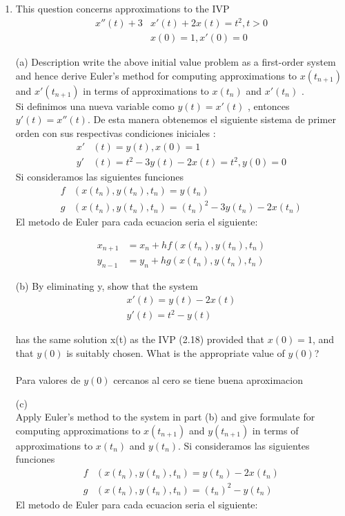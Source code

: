 \begin{enumerate}
 	\item
 	This question concerns approximations to the IVP
 	  \begin{align*}
 	     x''(t) + 3&x'(t) + 2x(t) = t^{2} , t > 0 \\
 	     &x(0) = 1, x'(0) = 0
 	  \end{align*}
 	\item[(a)]
 	Description write the above initial value problem as a first-order system
 	and hence derive Euler’s method for computing approximations to $x(t_{n+1})$ 
 	and $x'(t_{n+1})$ in terms of approximations to $x(t_n)$ and $x'(t_n)$ .\\
 	Si definimos una nueva variable como $y(t) = x'(t)$ , entonces $y'(t) = x''(t)$.
 	De esta manera obtenemos el siguiente sistema de primer orden con sus respectivas condiciones
 	iniciales :
 	 \begin{align*}
 	 x'&(t) = y(t),   x(0) = 1 \\
 	 y'&(t) = t^2 - 3y(t) - 2x(t) = t^{2} , y(0) = 0 
 	 \end{align*}
 	 	Si consideramos las siguientes funciones\\
 	 	\begin{align*}
 	 	f&(x(t_n), y(t_n), t_n) = y(t_n) \\
 	 	g&(x(t_n), y(t_n), t_n) = (t_n)^2 - 3y(t_n) - 2x(t_n)
 	 	\end{align*}
 	 	El metodo de Euler para cada ecuacion seria el siguiente:
 	 	
 	 	\begin{align*}
 	 	x_{n+1} &= x_n + hf(x(t_n), y(t_n), t_n) \\
 	 	y_{n-1} &= y_n + hg(x(t_n), y(t_n), t_n)   
 	 	\end{align*}	
 	 	
 	
 	\item[(b)]
 	By eliminating y, show that the system
 	  \begin{align*}
 		x'(t) = y(t) - 2x(t) \\
 		y'(t) = t^2 - y(t) 
 	  \end{align*}
 	  
 	has the same solution x(t) as the IVP (2.18) provided that
 	$x(0) = 1$, and that $y(0)$ is suitably chosen. What is the appropriate value of $y(0)$?\\
 	\\
 	Para valores de $y(0)$ cercanos al cero se tiene buena aproximacion
 	\item[(c)]
 	\\
 	Apply Euler’s method to the system in part (b) and give formulate for computing 
 	approximations to $x(t_{n+1})$ and $y(t_{n+1})$ in terms of approximations to $x(t_n)$ and $y(t_n)$.
 		 	Si consideramos las siguientes funciones\\
 		 	\begin{align*}
 		 	f&(x(t_n), y(t_n), t_n) = y(t_n) - 2x(t_n) \\
 		 	g&(x(t_n), y(t_n), t_n) = (t_n)^2 - y(t_n) 
 		 	\end{align*}
 		 	El metodo de Euler para cada ecuacion seria el siguiente:
 		 	

\end{enumerate}
